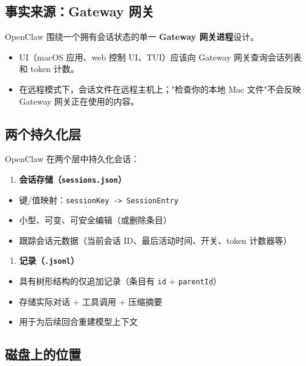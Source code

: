 \hrulefill


\subsection{事实来源：Gateway 网关}


OpenClaw 围绕一个拥有会话状态的单一 \textbf{Gateway 网关进程}设计。

\begin{itemize}
  \item UI（macOS 应用、web 控制 UI、TUI）应该向 Gateway 网关查询会话列表和 token 计数。
  \item 在远程模式下，会话文件在远程主机上；"检查你的本地 Mac 文件"不会反映 Gateway 网关正在使用的内容。
\end{itemize}


\hrulefill


\subsection{两个持久化层}


OpenClaw 在两个层中持久化会话：

\begin{enumerate}
  \item \textbf{会话存储（\texttt{sessions.json}）}
\end{enumerate}

\begin{itemize}
  \item 键/值映射：\texttt{sessionKey -> SessionEntry}
  \item 小型、可变、可安全编辑（或删除条目）
  \item 跟踪会话元数据（当前会话 ID、最后活动时间、开关、token 计数器等）
\end{itemize}


\begin{enumerate}
  \item \textbf{记录（\texttt{.jsonl}）}
\end{enumerate}

\begin{itemize}
  \item 具有树形结构的仅追加记录（条目有 \texttt{id} + \texttt{parentId}）
  \item 存储实际对话 + 工具调用 + 压缩摘要
  \item 用于为后续回合重建模型上下文
\end{itemize}


\hrulefill


\subsection{磁盘上的位置}


